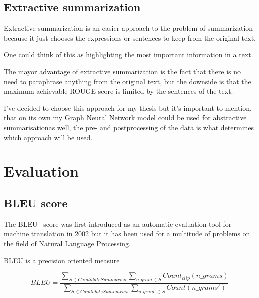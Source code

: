 \subsection{Extractive summarization}
Extractive summarization is an easier approach to the problem of summarization because it just chooses the expressions or sentences to keep from the original text.

One could think of this as highlighting the most important information in a text.

The mayor advantage of extractive summarization is the fact that there is no need to paraphrase anything from the original text, but the downside is that the maximum achievable ROUGE score is limited by the sentences of the text.

I've decided to choose this approach for my thesis but it's important to mention, that on its own my Graph Neural Network model could be used for abstractive summarisationas well, the pre- and postprocessing of the data is what determines which approach will be used.


\section{Evaluation}

\subsection{BLEU score}
The BLEU~\cite{BLEU} score was first introduced as an automatic evaluation tool for machine translation in 2002 but it has been used for a multitude of problems on the field of Natural Language Processing.

BLEU is a precision oriented measure

\[BLEU = \frac{\sum_{S \in CandidateSummaries}\sum_{n\_gram \in S} Count_{clip} (n\_grams)}{\sum_{S \in CandidateSummaries}\sum_{n\_gram' \in S} Count(n\_grams')}\]

